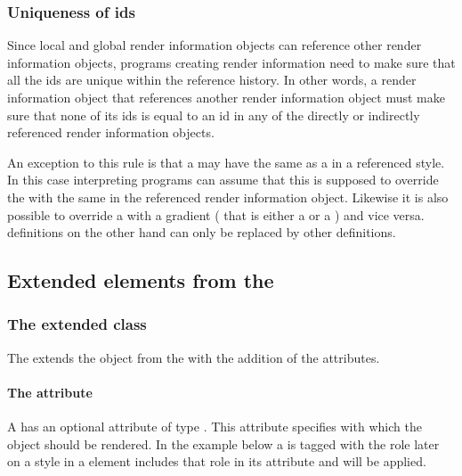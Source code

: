 \subsubsection{Uniqueness of ids}
Since local and global render information objects can reference other render information objects, programs creating
render information need to make sure that all the ids are unique within the reference history. In other words, a 
render information object that references another render information object must make sure that none of its ids is equal
to an id in any of the directly or indirectly referenced render information objects. 

An exception to this rule is that a \ColorDefinition may have the same  as a \ColorDefinition in a referenced style. In this case interpreting programs can assume that this \ColorDefinition is supposed to override the \ColorDefinition with the
same  in the referenced render information object. Likewise it is also possible to override a \ColorDefinition with a  gradient ( that is either a \LinearGradient or a \RadialGradient) and vice versa. \LineEnding definitions on the other hand can only be replaced by other \LineEnding definitions.

\subsection{Extended elements from the \LayoutPackage}


\subsubsection{The extended  class}
\label{graphicalobject-class}

The \RenderPackage extends the  object from the \LayoutPackage with the
addition of
the  attributes.

\paragraph{The \fixttspace{} attribute}


A \GraphicalObject has an optional attribute  of type
.  This attribute specifies with which \Style the object should be rendered. 
In the example below a \SpeciesGlyph is tagged with the role 
later on a style in a \GlobalRenderInformation element includes that role in its 
 attribute and will be applied.

